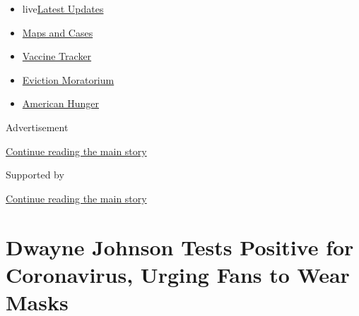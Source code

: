 \begin{itemize}
\tightlist
\item
  live\href{https://www.nytimes3xbfgragh.onion/2020/09/08/world/covid-19-coronavirus.html?name=styln-coronavirus-national\&region=TOP_BANNER\&block=storyline_menu_recirc\&action=click\&pgtype=Article\&impression_id=493ac1d1-f27e-11ea-8ef7-cd06f6acdb7f\&variant=undefined}{Latest
  Updates}
\item
  \href{https://www.nytimes3xbfgragh.onion/interactive/2020/us/coronavirus-us-cases.html?name=styln-coronavirus-national\&region=TOP_BANNER\&block=storyline_menu_recirc\&action=click\&pgtype=Article\&impression_id=493ac1d2-f27e-11ea-8ef7-cd06f6acdb7f\&variant=undefined}{Maps
  and Cases}
\item
  \href{https://www.nytimes3xbfgragh.onion/interactive/2020/science/coronavirus-vaccine-tracker.html?name=styln-coronavirus-national\&region=TOP_BANNER\&block=storyline_menu_recirc\&action=click\&pgtype=Article\&impression_id=493ac1d3-f27e-11ea-8ef7-cd06f6acdb7f\&variant=undefined}{Vaccine
  Tracker}
\item
  \href{https://www.nytimes3xbfgragh.onion/2020/09/02/your-money/eviction-moratorium-covid.html?name=styln-coronavirus-national\&region=TOP_BANNER\&block=storyline_menu_recirc\&action=click\&pgtype=Article\&impression_id=493ac1d4-f27e-11ea-8ef7-cd06f6acdb7f\&variant=undefined}{Eviction
  Moratorium}
\item
  \href{https://www.nytimes3xbfgragh.onion/interactive/2020/09/02/magazine/food-insecurity-hunger-us.html?name=styln-coronavirus-national\&region=TOP_BANNER\&block=storyline_menu_recirc\&action=click\&pgtype=Article\&impression_id=493ae8e0-f27e-11ea-8ef7-cd06f6acdb7f\&variant=undefined}{American
  Hunger}
\end{itemize}

Advertisement

\protect\hyperlink{after-top}{Continue reading the main story}

Supported by

\protect\hyperlink{after-sponsor}{Continue reading the main story}

\hypertarget{dwayne-johnson-tests-positive-for-coronavirus-urging-fans-to-wear-masks}{%
\section{Dwayne Johnson Tests Positive for Coronavirus, Urging Fans to
Wear
Masks}\label{dwayne-johnson-tests-positive-for-coronavirus-urging-fans-to-wear-masks}}

